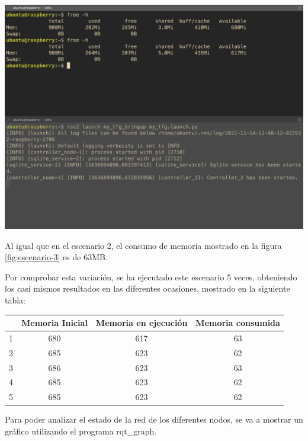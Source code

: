 \newpage

\begin{center}
    \centering
    \includegraphics[width=\textwidth]{img/09-Escenario3.png}
    \label{fig:escenario-3}
\end{center}

Al igual que en el escenario 2, el consumo de memoria mostrado en la figura \ref{fig:escenario-3} es de 63MB.

Por comprobar esta variación, se ha ejecutado este escenario 5 veces, obteniendo los casi mismos resultados en las diferentes ocasiones, mostrado en la siguiente tabla:


\begin{center}
\begin{tabular}{||c c c c||} 
 \hline
  & Memoria Inicial & Memoria en ejecución & Memoria consumida \\ [0.5ex] 
 \hline\hline
 1 & 680 & 617 & 63 \\ 
 \hline
 2 & 685 & 623 & 62 \\
 \hline
 3 & 686 & 623 & 63 \\
 \hline
 4 & 685 & 623 & 62 \\ 
 \hline
 5 & 685 & 623 & 62 \\


 \hline
\end{tabular}
\end{center}

Para poder analizar el estado de la red de los diferentes nodos, se va a mostrar un gráfico utilizando el programa rqt\_graph.

